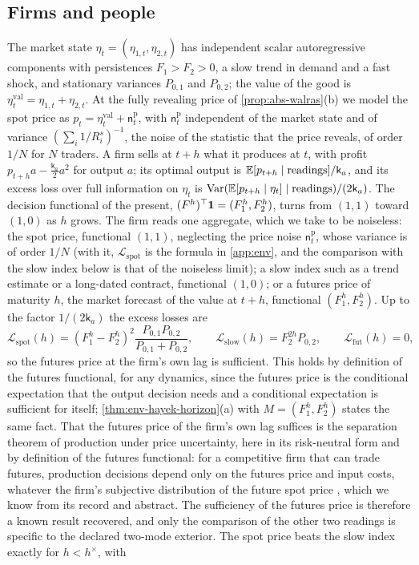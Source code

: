 \subsection{Firms and people}\label{sup:env-firms-and-people}

\begin{example}\label{ex:env-firm}
The market state $\eta_t=(\eta_{1,t},\eta_{2,t})$ has independent scalar autoregressive components with persistences $F_1>F_2>0$, a slow trend in demand and a fast shock, and stationary variances $P_{0,1}$ and $P_{0,2}$; the value of the good is $\eta^{\mathrm{val}}_t=\eta_{1,t}+\eta_{2,t}$. At the fully revealing price of \cref{prop:abs-walras}(b) we model the spot price as $p_t=\eta^{\mathrm{val}}_t+\mathsf n^{\mathrm p}_t$, with $\mathsf n^{\mathrm p}_t$ independent of the market state and of variance $(\sum_i1/R^s_i)^{-1}$, the noise of the statistic that the price reveals, of order $1/N$ for $N$ traders. A firm sells at $t+h$ what it produces at $t$, with profit $p_{t+h}a-\frac{\mathsf k_a}2a^2$ for output $a$; its optimal output is $\mathbb{E}[p_{t+h}\mid\text{readings}]/\mathsf k_a$, and its excess loss over full information on $\eta_t$ is $\operatorname{Var}(\mathbb{E}[p_{t+h}\mid\eta_t]\mid\text{readings})/(2\mathsf k_a)$. The decision functional of the present, $(F^h)^\top\mathbf{1}=(F_1^h,F_2^h)$, turns from $(1,1)$ toward $(1,0)$ as $h$ grows. The firm reads one aggregate, which we take to be noiseless: the spot price, functional $(1,1)$, neglecting the price noise $\mathsf n^{\mathrm p}_t$, whose variance is of order $1/N$ (with it, $\mathcal L_{\mathrm{spot}}$ is the formula in \cref{app:env}, and the comparison with the slow index below is that of the noiseless limit); a slow index such as a trend estimate or a long-dated contract, functional $(1,0)$; or a futures price of maturity $h$, the market forecast of the value at $t+h$, functional $(F_1^h,F_2^h)$. Up to the factor $1/(2\mathsf k_a)$ the excess losses are
\[
\mathcal L_{\mathrm{spot}}(h)=(F_1^h-F_2^h)^2\frac{P_{0,1}P_{0,2}}{P_{0,1}+P_{0,2}},\qquad\mathcal L_{\mathrm{slow}}(h)=F_2^{2h}P_{0,2},\qquad\mathcal L_{\mathrm{fut}}(h)=0,
\]
so the futures price at the firm's own lag is sufficient. This holds by definition of the futures functional, for any dynamics, since the futures price is the conditional expectation that the output decision needs and a conditional expectation is sufficient for itself; \cref{thm:env-hayek-horizon}(a) with $M=(F_1^h,F_2^h)$ states the same fact. That the futures price of the firm's own lag suffices is the separation theorem of production under price uncertainty, here in its risk-neutral form and by definition of the futures functional: for a competitive firm that can trade futures, production decisions depend only on the futures price and input costs, whatever the firm's subjective distribution of the future spot price \citep{feder1980futures}, which we know from its record and abstract. The sufficiency of the futures price is therefore a known result recovered, and only the comparison of the other two readings is specific to the declared two-mode exterior. The spot price beats the slow index exactly for $h<h^\times$, with

\end{example}
